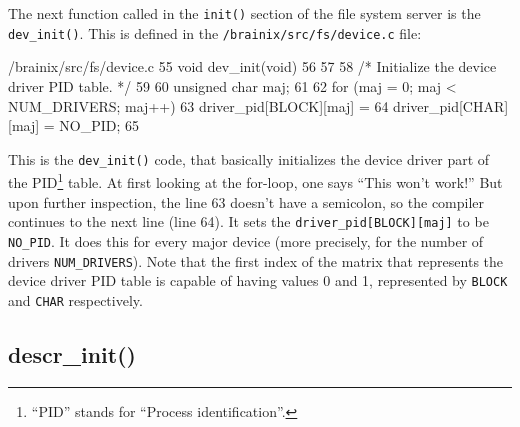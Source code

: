 \documentclass{article}
\begin{document}
The next function called in the \verb|init()| section of the file system server is the \verb|dev_init()|. This is defined in the \verb|/brainix/src/fs/device.c| file:
\begin{code}{/brainix/src/fs/device.c}
55 void dev_init(void)
56 {
57 
58 /* Initialize the device driver PID table. */
59 
60      unsigned char maj;
61 
62      for (maj = 0; maj < NUM_DRIVERS; maj++) 
63           driver_pid[BLOCK][maj] = 
64           driver_pid[CHAR][maj] = NO_PID;
65 }
\end{code}
This is the \verb|dev_init()| code, that basically initializes the device driver part of the PID\footnote{``PID'' stands for ``Process identification''.} table. At first looking at the for-loop, one says ``This won't work!'' But upon further inspection, the line 63 doesn't have a semicolon, so the compiler continues to the next line (line 64). It sets the \verb|driver_pid[BLOCK][maj]| to be \verb|NO_PID|. It does this for every major device (more precisely, for the number of drivers \verb|NUM_DRIVERS|). Note that the first index of the matrix that represents the device driver PID table is capable of having values 0 and 1, represented by \verb|BLOCK| and \verb|CHAR| respectively. 

\subsection{descr\_init()}
\end{document}

